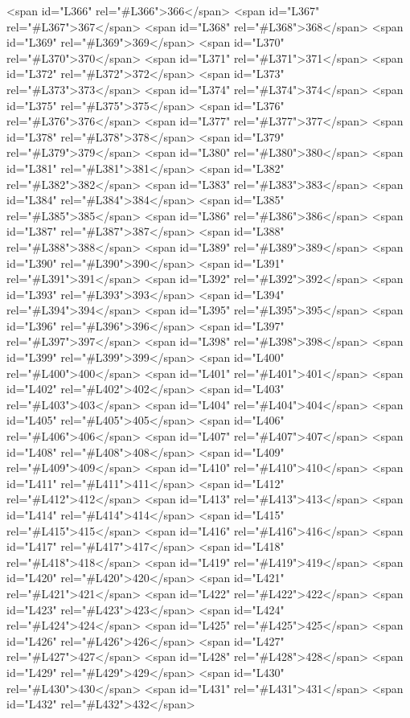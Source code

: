<span id="L366" rel="#L366">366</span>
<span id="L367" rel="#L367">367</span>
<span id="L368" rel="#L368">368</span>
<span id="L369" rel="#L369">369</span>
<span id="L370" rel="#L370">370</span>
<span id="L371" rel="#L371">371</span>
<span id="L372" rel="#L372">372</span>
<span id="L373" rel="#L373">373</span>
<span id="L374" rel="#L374">374</span>
<span id="L375" rel="#L375">375</span>
<span id="L376" rel="#L376">376</span>
<span id="L377" rel="#L377">377</span>
<span id="L378" rel="#L378">378</span>
<span id="L379" rel="#L379">379</span>
<span id="L380" rel="#L380">380</span>
<span id="L381" rel="#L381">381</span>
<span id="L382" rel="#L382">382</span>
<span id="L383" rel="#L383">383</span>
<span id="L384" rel="#L384">384</span>
<span id="L385" rel="#L385">385</span>
<span id="L386" rel="#L386">386</span>
<span id="L387" rel="#L387">387</span>
<span id="L388" rel="#L388">388</span>
<span id="L389" rel="#L389">389</span>
<span id="L390" rel="#L390">390</span>
<span id="L391" rel="#L391">391</span>
<span id="L392" rel="#L392">392</span>
<span id="L393" rel="#L393">393</span>
<span id="L394" rel="#L394">394</span>
<span id="L395" rel="#L395">395</span>
<span id="L396" rel="#L396">396</span>
<span id="L397" rel="#L397">397</span>
<span id="L398" rel="#L398">398</span>
<span id="L399" rel="#L399">399</span>
<span id="L400" rel="#L400">400</span>
<span id="L401" rel="#L401">401</span>
<span id="L402" rel="#L402">402</span>
<span id="L403" rel="#L403">403</span>
<span id="L404" rel="#L404">404</span>
<span id="L405" rel="#L405">405</span>
<span id="L406" rel="#L406">406</span>
<span id="L407" rel="#L407">407</span>
<span id="L408" rel="#L408">408</span>
<span id="L409" rel="#L409">409</span>
<span id="L410" rel="#L410">410</span>
<span id="L411" rel="#L411">411</span>
<span id="L412" rel="#L412">412</span>
<span id="L413" rel="#L413">413</span>
<span id="L414" rel="#L414">414</span>
<span id="L415" rel="#L415">415</span>
<span id="L416" rel="#L416">416</span>
<span id="L417" rel="#L417">417</span>
<span id="L418" rel="#L418">418</span>
<span id="L419" rel="#L419">419</span>
<span id="L420" rel="#L420">420</span>
<span id="L421" rel="#L421">421</span>
<span id="L422" rel="#L422">422</span>
<span id="L423" rel="#L423">423</span>
<span id="L424" rel="#L424">424</span>
<span id="L425" rel="#L425">425</span>
<span id="L426" rel="#L426">426</span>
<span id="L427" rel="#L427">427</span>
<span id="L428" rel="#L428">428</span>
<span id="L429" rel="#L429">429</span>
<span id="L430" rel="#L430">430</span>
<span id="L431" rel="#L431">431</span>
<span id="L432" rel="#L432">432</span>
